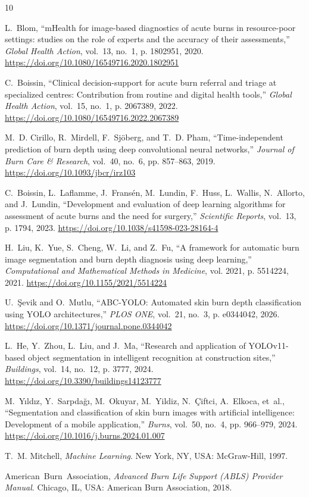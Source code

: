 \documentclass[11pt,a4paper]{article}
\begin{document}
\begin{thebibliography}{10}

L.~Blom, ``mHealth for image-based diagnostics of acute burns in resource-poor settings: studies on the role of experts and the accuracy of their assessments,'' \emph{Global Health Action}, vol.~13, no.~1, p. 1802951, 2020. \url{https://doi.org/10.1080/16549716.2020.1802951}

C.~Boissin, ``Clinical decision-support for acute burn referral and triage at specialized centres: Contribution from routine and digital health tools,'' \emph{Global Health Action}, vol.~15, no.~1, p. 2067389, 2022. \url{https://doi.org/10.1080/16549716.2022.2067389}

M.~D. Cirillo, R.~Mirdell, F.~Sj{\"o}berg, and T.~D. Pham, ``Time-independent prediction of burn depth using deep convolutional neural networks,'' \emph{Journal of Burn Care \& Research}, vol.~40, no.~6, pp. 857--863, 2019. \url{https://doi.org/10.1093/jbcr/irz103}

C.~Boissin, L.~Laflamme, J.~Frans{\'e}n, M.~Lundin, F.~Huss, L.~Wallis, N.~Allorto, and J.~Lundin, ``Development and evaluation of deep learning algorithms for assessment of acute burns and the need for surgery,'' \emph{Scientific Reports}, vol.~13, p. 1794, 2023. \url{https://doi.org/10.1038/s41598-023-28164-4}

H.~Liu, K.~Yue, S.~Cheng, W.~Li, and Z.~Fu, ``A framework for automatic burn image segmentation and burn depth diagnosis using deep learning,'' \emph{Computational and Mathematical Methods in Medicine}, vol. 2021, p. 5514224, 2021. \url{https://doi.org/10.1155/2021/5514224}

U.~\c{S}evik and O.~Mutlu, ``ABC-YOLO: Automated skin burn depth classification using YOLO architectures,'' \emph{PLOS ONE}, vol.~21, no.~3, p. e0344042, 2026. \url{https://doi.org/10.1371/journal.pone.0344042}

L.~He, Y.~Zhou, L.~Liu, and J.~Ma, ``Research and application of YOLOv11-based object segmentation in intelligent recognition at construction sites,'' \emph{Buildings}, vol.~14, no.~12, p. 3777, 2024. \url{https://doi.org/10.3390/buildings14123777}

M.~Y{\i}ld{\i}z, Y.~Sarpda{\u{g}}{\i}, M.~Okuyar, M.~Yildiz, N.~{\c{C}}iftci, A.~Elkoca, et~al., ``Segmentation and classification of skin burn images with artificial intelligence: Development of a mobile application,'' \emph{Burns}, vol.~50, no.~4, pp. 966--979, 2024. \url{https://doi.org/10.1016/j.burns.2024.01.007}

T.~M. Mitchell, \emph{Machine Learning}. New York, NY, USA: McGraw-Hill, 1997.

American~Burn~Association, \emph{Advanced Burn Life Support (ABLS) Provider Manual}. Chicago, IL, USA: American Burn Association, 2018.

\end{thebibliography}
\end{document}
